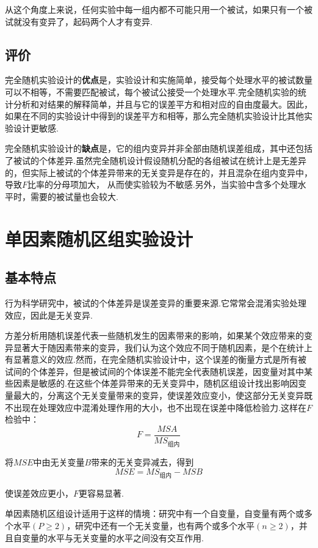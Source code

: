 从这个角度上来说，任何实验中每一组内都不可能只用一个被试，如果只有一个被试就没有变异了，起码两个人才有变异.

\subsection{评价}

完全随机实验设计的\textbf{优点}是，实验设计和实施简单，接受每个处理水平的被试数量可以不相等，不需要匹配被试，每个被试公接受一个处理水平.完全随机实验的统计分析和对结果的解释简单，并且与它的误差平方和相对应的自由度最大。因此，如果在不同的实验设计中得到的误差平方和相等，那么完全随机实验设计比其他实验设计更敏感.

完全随机实验设计的\textbf{缺点}是，它的组内变异并非全部由随机误差组成，其中还包括了被试的个体差异.虽然完全随机设计假设随机分配的各组被试在统计上是无差异的，但实际上被试的个体差异带来的无关变异是存在的，并且混杂在组内变异中，导致$F$比率的分母项加大， 从而使实验较为不敏感.另外，当实验中含多个处理水平时，需要的被试量也会较大.



\section{单因素随机区组实验设计}

\subsection{基本特点}
行为科学研究中，被试的个体差异是误差变异的重要来源.它常常会混淆实验处理效应，因此是无关变异.

方差分析用随机误差代表一些随机发生的因素带来的影响，如果某个效应带来的变异显著大于随因素带来的变异，我们认为这个效应不同于随机因素，是个在统计上有显著意义的效应.然而，在完全随机实验设计中，这个误差的衡量方式是所有被试间的个体差异，但是被试间的个体误差不能完全代表随机误差，因变量对其中某些因素是敏感的.在这些个体差异带来的无关变异中，随机区组设计找出影响因变量最大的，分离这个无关变量带来的变异，使误差效应变小，使这部分无关变异既不出现在处理效应中混淆处理作用的大小，也不出现在误差中降低检验力.这样在$F$检验中：
\[F=\frac{MSA}{MS_{\text{组内}}}\]

将$MSE$中由无关变量$B$带来的无关变异减去，得到
\[MSE=MS_{组内}-MSB\]

使误差效应更小，$F$更容易显著.

单因素随机区组设计适用于这样的情境：研究中有一个自变量，自变量有两个或多个水平$\left( P \geq 2 \right)$，研究中还有一个无关变量，也有两个或多个水平$\left( n \geq 2 \right)$，并且自变量的水平与无关变量的水平之间没有交互作用.

